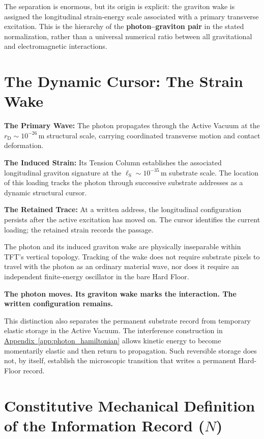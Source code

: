 The separation is enormous, but its origin is explicit: the graviton wake is assigned the longitudinal strain-energy scale associated with a primary transverse excitation. This is the hierarchy of the \textbf{photon--graviton pair} in the stated normalization, rather than a universal numerical ratio between all gravitational and electromagnetic interactions.

\section{The Dynamic Cursor: The Strain Wake}
\label{sec:AC_dynamic_cursor}

\noindent\textbf{The Primary Wave:}
The photon propagates through the Active Vacuum at the $r_{\mathrm D}\sim10^{-26}\,\mathrm m$ structural scale, carrying coordinated transverse motion and contact deformation.

\medskip
\noindent\textbf{The Induced Strain:}
Its Tension Column establishes the associated longitudinal graviton signature at the $\ell_{\mathrm S}\sim10^{-35}\,\mathrm m$ substrate scale. The location of this loading tracks the photon through successive substrate addresses as a dynamic structural cursor.

\medskip
\noindent\textbf{The Retained Trace:}
At a written address, the longitudinal configuration persists after the active excitation has moved on. The cursor identifies the current loading; the retained strain records the passage.

The photon and its induced graviton wake are physically inseparable within TFT's vertical topology. Tracking of the wake does not require substrate pixels to travel with the photon as an ordinary material wave, nor does it require an independent finite-energy oscillator in the bare Hard Floor.

\noindent\textbf{The photon moves. Its graviton wake marks the interaction. The written configuration remains.}

This distinction also separates the permanent substrate record from temporary elastic storage in the Active Vacuum. The interference construction in \hyperref[app:photon_hamiltonian]{Appendix~\ref*{app:photon_hamiltonian}} allows kinetic energy to become momentarily elastic and then return to propagation. Such reversible storage does not, by itself, establish the microscopic transition that writes a permanent Hard-Floor record.

\section[Constitutive Mechanical Definition of the Information Record (N)]{Constitutive Mechanical Definition\\of the Information Record ($N$)}
\label{sec:AC_information_record}

